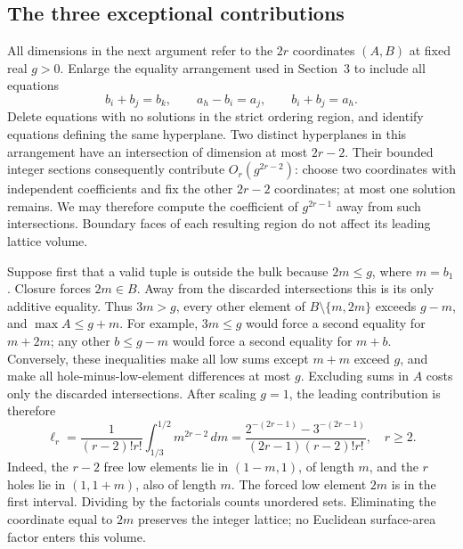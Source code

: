 \documentclass[11pt]{article}
\theoremstyle{remark}\newtheorem{remark}[theorem]{Remark}
\begin{document}
\subsection{The three exceptional contributions}

All dimensions in the next argument refer to the $2r$ coordinates $(A,B)$
at fixed real $g>0$. Enlarge the equality arrangement used in Section~3 to
include all equations
\[
 b_i+b_j=b_k,\qquad a_h-b_i=a_j,\qquad b_i+b_j=a_h.
\]
Delete equations with no solutions in the strict ordering region, and
identify equations defining the same hyperplane. Two distinct hyperplanes
in this arrangement have an intersection of dimension at most $2r-2$.
Their bounded integer sections consequently contribute $O_r(g^{2r-2})$:
choose two coordinates with independent coefficients and fix the other
$2r-2$ coordinates; at most one solution remains. We may therefore compute
the coefficient of $g^{2r-1}$ away from such intersections. Boundary faces
of each resulting region do not affect its leading lattice volume.

Suppose first that a valid tuple is outside the bulk because $2m\le g$,
where $m=b_1$. Closure forces $2m\in B$. Away from the discarded
intersections this is its only additive equality. Thus $3m>g$, every
other element of $B\setminus\{m,2m\}$ exceeds $g-m$, and $\max A\le g+m$.
For example, $3m\le g$ would force a second equality for $m+2m$; any
other $b\le g-m$ would force a second equality for $m+b$. Conversely,
these inequalities make all low sums except $m+m$ exceed $g$, and make
all hole-minus-low-element differences at most $g$. Excluding sums in
$A$ costs only the discarded intersections. After scaling $g=1$, the
leading contribution is therefore
\begin{equation}\label{eq:kappa-low}
\ell_r=\frac{1}{(r-2)!r!}\int_{1/3}^{1/2}m^{2r-2}\,dm
=\frac{2^{-(2r-1)}-3^{-(2r-1)}}{(2r-1)(r-2)!r!},
\quad r\ge2.
\end{equation}
Indeed, the $r-2$ free low elements lie in $(1-m,1)$, of length $m$,
and the $r$ holes lie in $(1,1+m)$, also of length $m$. The forced low
element $2m$ is in the first interval. Dividing by the factorials counts
unordered sets. Eliminating the coordinate equal to $2m$ preserves the
integer lattice; no Euclidean surface-area factor enters this volume.
\end{document}
